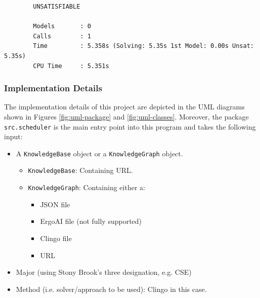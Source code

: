 \documentclass[12pt]{article}
\begin{document}
    \begin{verbatim}
        UNSATISFIABLE
        
        Models       : 0
        Calls        : 1
        Time         : 5.358s (Solving: 5.35s 1st Model: 0.00s Unsat: 5.35s)
        CPU Time     : 5.351s
    \end{verbatim}

    
    

    \subsubsection{Implementation Details}
    \label{subsubsec:implementation}

    
    The implementation details of this project are depicted in the UML diagrams shown in Figures \ref{fig:uml-package} and \ref{fig:uml-classes}. Moreover, the package {\tt{src.scheduler}} is the main entry point into this program and takes the following input:

    \begin{itemize}
        \item A {\tt{KnowledgeBase}} object or a  {\tt{KnowledgeGraph}} object.
        \begin{itemize}
            \item {\tt{KnowledgeBase}}: Containing URL.
            \item {\tt{KnowledgeGraph}}: Containing either a:
            \begin{itemize}
                \item JSON file
                \item ErgoAI file (not fully supported)
                \item Clingo file
                \item URL
            \end{itemize}
        \end{itemize}
        \item Major (using Stony Brook's three designation, e.g. CSE)
        \item Method (i.e. solver/approach to be used): Clingo in this case.
    \end{itemize}
\end{document}
